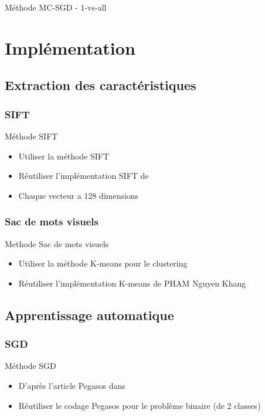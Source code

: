 \documentclass[11pt]{beamer}
\begin{document}
\begin{otherlanguage}{french}
\begin{frame}{Méthode MC-SGD - 1-vs-all}
\end{frame}



\section{Implémentation}
\subsection{Extraction des caractéristiques}
\subsubsection*{SIFT}
\begin{frame}{Méthode SIFT}
\begin{itemize}
\item Utiliser la méthode SIFT
\item Réutiliser l'implémentation SIFT de \cite{low99}
\item Chaque vecteur a 128 dimensions
\end{itemize}
\end{frame}

\subsubsection*{Sac de mots visuels}
\begin{frame}{Methode Sac de mots visuels}
\begin{itemize}
\item Utiliser la méthode K-means pour le clustering
\item Réutiliser l'implémentation K-means de PHAM Nguyen Khang
\end{itemize}
\end{frame}

\subsection{Apprentissage automatique}
\subsubsection*{SGD}
\begin{frame}{Méthode SGD}
\begin{itemize}
\item D'après l'article Pegasos dans \cite{sss07}
\item Réutiliser le codage Pegasos pour le problème binaire (de 2 classes)
\end{itemize}


\end{frame}
\end{otherlanguage}
\end{document}
